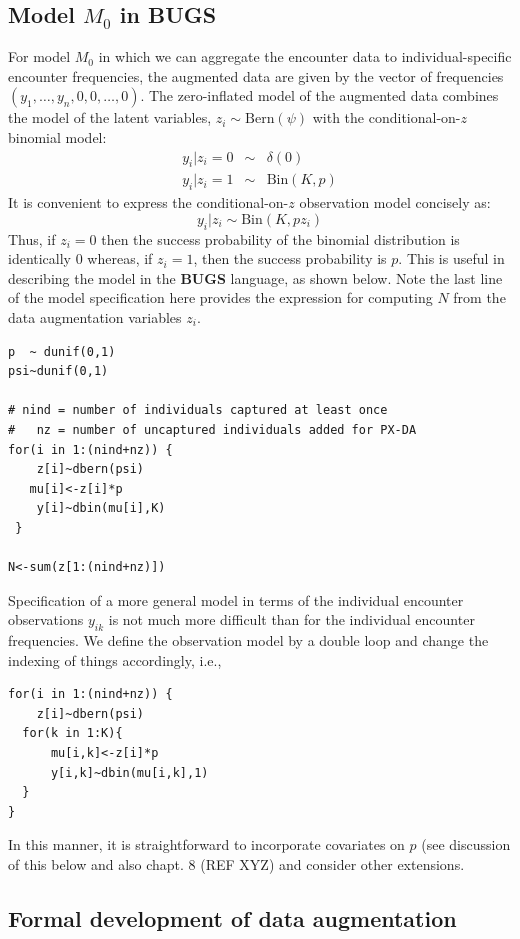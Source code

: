 \subsection{Model $M_0$ in BUGS}

For model $M_0$ in which we can aggregate the encounter data to
individual-specific encounter frequencies, the augmented data are
given by the vector of frequencies $(y_{1}, \ldots, y_{n}, 0, 0,
\ldots, 0)$. The zero-inflated model of the augmented data combines
the model of the latent variables, $z_{i} \sim \mbox{Bern}(\psi)$ with
the conditional-on-$z$ binomial model:
\begin{eqnarray*}
y_{i} | z_{i} = 0 &\sim& \delta(0) \\
y_{i}|z_{i} = 1   &\sim& \mbox{Bin}(K,p)
\end{eqnarray*}
It is convenient to express the conditional-on-$z$ observation model concisely as:
\[
 y_{i}|z_{i} \sim \mbox{Bin}(K, p z_{i})
\]
Thus, if $z_{i}=0$ then the success probability of the binomial
distribution is identically 0 whereas, if $z_{i}=1$, then the success
probability is $p$. This is useful in describing the model in the {\bf
  BUGS}
language, as shown below. Note the last line of the model
specification here provides the expression for computing $N$ from the
data augmentation variables $z_{i}$.
{\small
\begin{verbatim}
p  ~ dunif(0,1)
psi~dunif(0,1)

# nind = number of individuals captured at least once
#   nz = number of uncaptured individuals added for PX-DA
for(i in 1:(nind+nz)) {
    z[i]~dbern(psi)
   mu[i]<-z[i]*p
    y[i]~dbin(mu[i],K)
 }

N<-sum(z[1:(nind+nz)])
\end{verbatim}
}


Specification of a more general model in terms of the individual
encounter observations $y_{ik}$ is not much more difficult than for
the individual encounter frequencies.  We define the
observation model by a double loop and change the indexing of things
accordingly, i.e.,
\begin{verbatim}
for(i in 1:(nind+nz)) {
    z[i]~dbern(psi)
  for(k in 1:K){
      mu[i,k]<-z[i]*p
      y[i,k]~dbin(mu[i,k],1)
  }
}
\end{verbatim}
In this manner, it is straightforward to incorporate covariates on $p$
(see discussion of this below and also chapt. 8 (REF XYZ) and consider
other extensions.


\subsection{Formal development of data augmentation}

